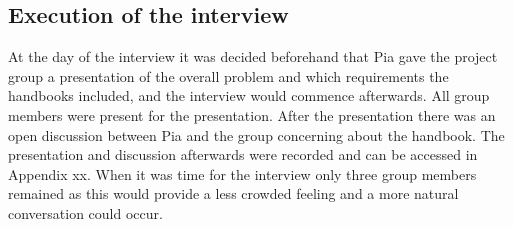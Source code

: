 \subsection{Execution of the interview}

At the day of the interview it was decided beforehand that Pia gave the project group a presentation of the overall problem and which requirements the handbooks included, and the interview would commence afterwards. All group members were present for the presentation. After the presentation there was an open discussion between Pia and the group concerning about the handbook. The presentation and discussion afterwards were recorded and can be accessed in Appendix xx. When it was time for the interview only three group members remained as this would provide a less crowded feeling and a more natural conversation could occur.
